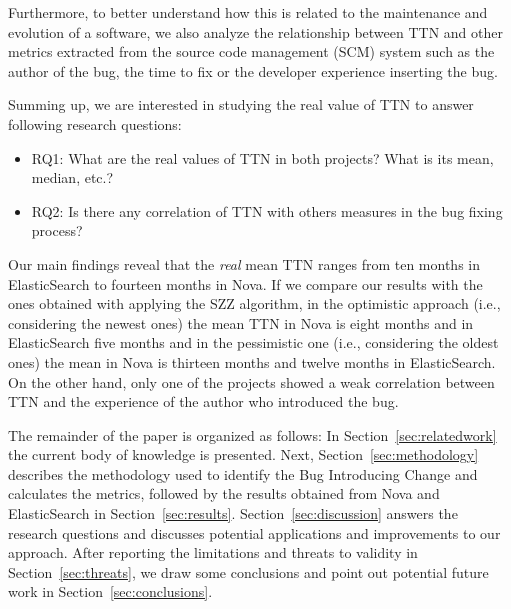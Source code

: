 \documentclass[10pt, conference]{IEEEtran}
\begin{document}
Furthermore, to better understand how this is related to the maintenance and evolution of a software, we also analyze the relationship between TTN and other metrics extracted from the source code management (SCM) system such as the author of the bug, the time to fix or the developer experience inserting the bug.

Summing up, we are interested in studying the real value of TTN to answer following research questions:

\begin{itemize}
\item RQ1: What are the real values of TTN in both projects? What is its mean, median, etc.?
\item RQ2: Is there any correlation of TTN with others measures in the bug fixing process? 
\end{itemize}

Our main findings reveal that the \emph{real} mean TTN ranges from ten months in ElasticSearch to fourteen months in Nova. If we compare our results with the ones obtained with applying the SZZ algorithm, in the optimistic approach (i.e., considering the newest ones) the mean TTN in Nova is eight months and in ElasticSearch five months and in the pessimistic one (i.e., considering the oldest ones) the mean in Nova is thirteen months and twelve months in ElasticSearch. On the other hand, only one of the projects showed a weak correlation between TTN and the experience of the author who introduced the bug. 

The remainder of the paper is organized as follows: In Section~\ref{sec:relatedwork} the current body of knowledge is presented. Next, Section~\ref{sec:methodology} describes the methodology used to identify the Bug Introducing Change and calculates the metrics, followed by the results obtained from Nova and ElasticSearch in Section~\ref{sec:results}. Section~\ref{sec:discussion} answers the research questions and discusses potential applications and improvements to our approach. After reporting the limitations and threats to validity in Section~\ref{sec:threats}, we draw some conclusions and point out potential future work in Section~\ref{sec:conclusions}.
\end{document}
